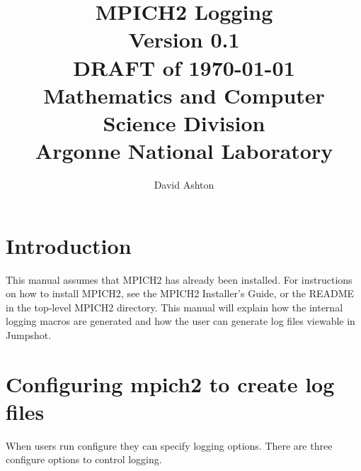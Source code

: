 \documentclass[dvipdfm,11pt]{article}
\begin{document}
\title{MPICH2 Logging\\
Version 0.1\\
DRAFT of \today\\
Mathematics and Computer Science Division\\
Argonne National Laboratory}

\author{David Ashton}


\maketitle

\cleardoublepage

\pagestyle{headings}


\section{Introduction}
\label{sec:introduction}

This manual assumes that MPICH2 has already been installed.  For
instructions on how to install MPICH2, see the MPICH2 Installer's Guide,
or the README in the top-level MPICH2 directory.  This manual will
explain how the internal logging macros are generated and how the user
can generate log files viewable in Jumpshot.


\section{Configuring mpich2 to create log files}
\label{sec:configuring}

When users run configure they can specify logging options.  There are three 
configure options to control logging.
\end{document}
